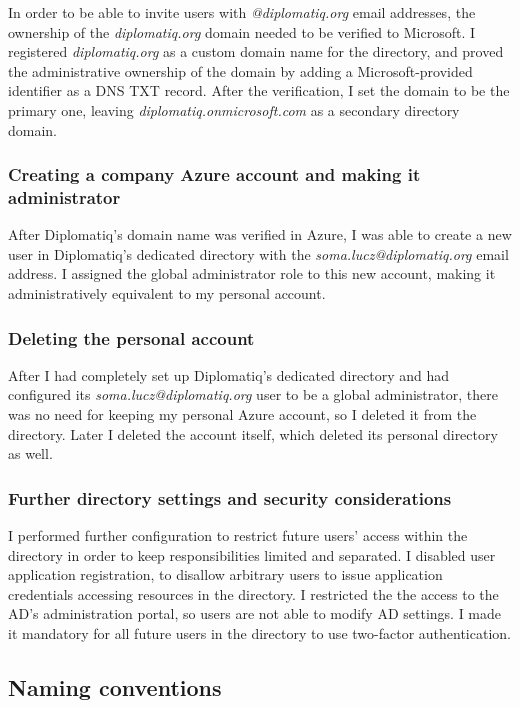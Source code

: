 In order to be able to invite users with \emph{@diplomatiq.org} email addresses, the ownership of the \emph{diplomatiq.org} domain needed to be verified to Microsoft. I registered \emph{diplomatiq.org} as a custom domain name for the directory, and proved the administrative ownership of the domain by adding a Microsoft-provided identifier as a DNS TXT record. After the verification, I set the domain to be the primary one, leaving \emph{diplomatiq.onmicrosoft.com} as a secondary directory domain.

\subsubsection{Creating a company Azure account and making it administrator}

After Diplomatiq's domain name was verified in Azure, I was able to create a new user in Diplomatiq's dedicated directory with the \emph{soma.lucz@diplomatiq.org} email address. I assigned the global administrator role to this new account, making it administratively equivalent to my personal account.

\subsubsection{Deleting the personal account}

After I had completely set up Diplomatiq's dedicated directory and had configured its \emph{soma.lucz@diplomatiq.org} user to be a global administrator, there was no need for keeping my personal Azure account, so I deleted it from the directory. Later I deleted the account itself, which deleted its personal directory as well.

\subsubsection{Further directory settings and security considerations}

I performed further configuration to restrict future users' access within the directory in order to keep responsibilities limited and separated. I disabled user application registration, to disallow arbitrary users to issue application credentials accessing resources in the directory. I restricted the the access to the AD's administration portal, so users are not able to modify AD settings. I made it mandatory for all future users in the directory to use two-factor authentication.

\subsection{Naming conventions}

